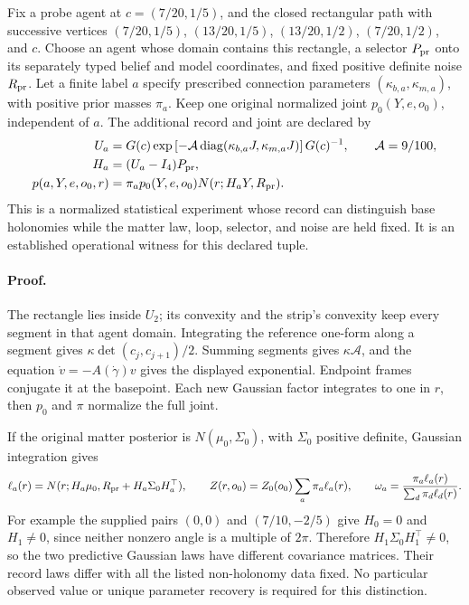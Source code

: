Fix a probe agent at \(c=(7/20,1/5)\), and the closed rectangular path
with successive vertices
\((7/20,1/5)\), \((13/20,1/5)\), \((13/20,1/2)\), \((7/20,1/2)\), and \(c\).
Choose an agent whose domain contains this rectangle, a selector \(P_{\rm pr}\)
onto its separately typed belief and model coordinates, and fixed positive
definite noise \(R_{\rm pr}\). Let a finite label \(a\) specify prescribed
connection parameters \((\kappa_{b,a},\kappa_{m,a})\), with positive prior
masses \(\pi_a\). Keep one original normalized joint
\(p_0(Y,e,o_0)\), independent of \(a\). The additional record and joint
are declared by
\begin{equation}
\begin{aligned}
 U_a&=G(c)\exp\left[-\mathcal A 
       \operatorname{diag}(\kappa_{b,a}J,\kappa_{m,a}J)\right]G(c)^{-1},
 \qquad \mathcal A=9/100,\\
 H_a&=(U_a-I_4)P_{\rm pr},\\
 p(a,Y,e,o_0,r)&=\pi_a p_0(Y,e,o_0)
                       N(r;H_aY,R_{\rm pr}).
\end{aligned}
\label{eq:rg-cover-loop-observation}
\end{equation}
This is a normalized statistical experiment whose record can distinguish
base holonomies while the matter law, loop, selector, and noise are held
fixed. It is an established operational witness for this declared tuple.

\paragraph{Proof.}
The rectangle lies inside \(U_2\); its convexity and the strip's convexity
keep every segment in that agent domain. Integrating the reference
one-form along a segment gives
\(\kappa\det(c_j,c_{j+1})/2\). Summing segments gives
\(\kappa\mathcal A\), and the equation \(\dot v=-A(\dot\gamma)v\)
gives the displayed exponential. Endpoint frames conjugate it at the
basepoint. Each new Gaussian factor integrates to one in \(r\), then
\(p_0\) and \(\pi\) normalize the full joint.

If the original matter posterior is \(N(\mu_0,\Sigma_0)\), with
\(\Sigma_0\) positive definite, Gaussian integration gives
\begin{equation}
 \ell_a(r)=N(r;H_a\mu_0,R_{\rm pr}+H_a\Sigma_0H_a^\top),\qquad
 Z(r,o_0)=Z_0(o_0)\sum_a\pi_a\ell_a(r),\qquad
 \omega_a=\frac{\pi_a\ell_a(r)}{\sum_d\pi_d\ell_d(r)}.
\label{eq:rg-cover-loop-evidence}
\end{equation}
For example the supplied pairs \((0,0)\) and \((7/10,-2/5)\) give
\(H_0=0\) and \(H_1\ne0\), since neither nonzero angle is a multiple
of \(2\pi\). Therefore
\(H_1\Sigma_0H_1^\top\ne0\), so the two predictive Gaussian laws
have different covariance matrices. Their record laws differ with all the
listed non-holonomy data fixed. No particular observed value or unique
parameter recovery is required for this distinction.

